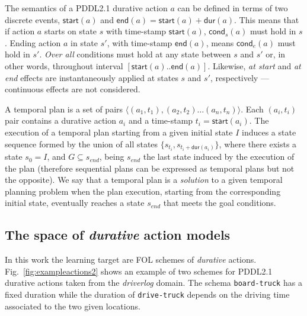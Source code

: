 \documentclass{ecai}
\newcommand{\tup}[1]{{\langle #1 \rangle}}
\newcommand{\cond}{\mathsf{cond}}  %
\newcommand{\dur}{\mathsf{dur}}    %
\newcommand{\start}{\mathsf{start}}%
\newcommand{\en}{\mathsf{end}}     %
\begin{document}
The semantics of a PDDL2.1 durative action $a$ can be defined in terms of two discrete events, $\start(a)$ and $\en(a)=\start(a)+\dur(a)$. This means that if action $a$ starts on state $s$ with time-stamp $\start(a)$, $\cond_s(a)$ must hold in $s$. Ending action $a$ in state $s'$, with time-stamp $\en(a)$, means $\cond_e(a)$ must hold in $s'$. {\em Over all} conditions must hold at any state between $s$ and $s'$ or, in other words, throughout interval $[\start(a)..\en(a)]$. Likewise, {\em at start} and {\em at end} effects are instantaneously applied at states $s$ and $s'$, respectively ---continuous effects are not considered. 

A temporal plan is a set of pairs $\tup{(a_1,t_1),(a_2,t_2)\ldots (a_n,t_n)}$. Each $(a_i,t_i)$ pair contains a durative action $a_i$ and a time-stamp $t_i=\start(a_i)$. The execution of a temporal plan starting from a given initial state $I$ induces a state sequence formed by the union of all states $\{s_{t_i}, s_{t_i+\dur(a_i)}\}$, where there exists a state $s_{0}=I$, and $G\subseteq s_{end}$, being $s_{end}$ the last state induced by the execution of the plan (therefore sequential plans can be expressed as temporal plans but not the opposite). We say that a temporal plan is a {\em solution} to a given temporal planning problem when the plan execution, starting from the corresponding initial state, eventually reaches a state $s_{end}$ that meets the goal conditions.

\subsection{The space of {\em durative} action models}
\label{sec:action-space}
In this work the learning target are FOL schemes of {\em durative} actions. Fig.~\ref{fig:exampleactions2} shows an example of two schemes for PDDL2.1 durative actions taken from the {\em driverlog} domain. The schema \texttt{board-truck} has a fixed duration while the duration of \texttt{drive-truck} depends on the driving time associated to the two given locations.
\end{document}
